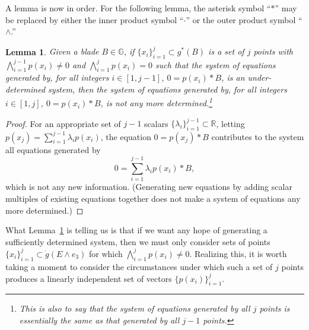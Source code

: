 \documentclass{birkjour}
\newtheorem{lem}[thm]{Lemma}
\theoremstyle{definition}
\theoremstyle{remark}
\numberwithin{equation}{section}
\newcommand{\R}{\mathbb{R}}
\newcommand{\G}{\mathbb{G}}
\newcommand{\gd}{\dot{g}}
\begin{document}
A lemma is now in order.  For the following lemma, the asterisk symbol ``$*$'' may be
replaced by either the inner product symbol ``$\cdot$'' or the outer product symbol ``$\wedge$.''

\begin{lem}\label{lma_determine_system}
Given a blade $B\in\G$, if $\{x_i\}_{i=1}^j\subset g^*(B)$ is a
set of $j$ points with $\bigwedge_{i=1}^{j-1} p(x_i)\neq 0$ and $\bigwedge_{i=1}^j p(x_i)=0$ such
that the system of equations generated by, for all integers $i\in[1,j-1]$, $0=p(x_i)* B$,
is an under-determined system, then the system of equations generated by,
for all integers $i\in[1,j]$, $0=p(x_i)* B$, is not any more determined.\footnote{This is
also to say that the system of equations generated by all $j$ points is essentially the
same as that generated by all $j-1$ points.}
\end{lem}
\begin{proof}
For an appropriate set of $j-1$ scalars $\{\lambda_i\}_{i=1}^{j-1}\subset\R$, letting $p(x_j)=\sum_{i=1}^{j-1}\lambda_i p(x_i)$,
the equation $0=p(x_j)* B$ contributes to the system all equations generated by
\begin{equation*}
0 = \sum_{i=1}^{j-1}\lambda_ip(x_i)* B,
\end{equation*}
which is not any new information.  (Generating new equations by adding scalar multiples of existing equations
together does not make a system of equations any more determined.)
\end{proof}
What Lemma~\ref{lma_determine_system} is telling us is that if we want any hope of generating a sufficiently determined
system, then we must only consider sets of points $\{x_i\}_{i=1}^j\subset\gd(E\wedge e_3)$
for which $\bigwedge_{i=1}^j p(x_i)\neq 0$.  Realizing this, it is worth taking a moment to
consider the circumstances under which such a set of $j$ points produces a linearly
independent set of vectors $\{p(x_i)\}_{i=1}^j$.
\end{document}
